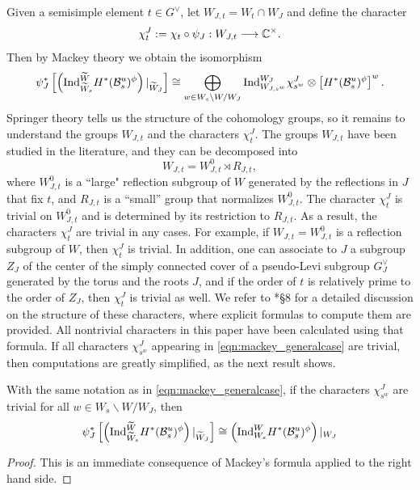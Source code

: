 Given a semisimple element $t\in G^\vee$, let $W_{J,t}=W_t\cap W_J$ and define the character
\begin{equation}
    \chi_t^J:=\chi_t\circ\psi_J:W_{J,t}\longrightarrow\mathbb{C}^\times.
\end{equation}
Then by Mackey theory we obtain the isomorphism
\begin{equation}\label{eqn:mackey_generalcase}
    \psi_J^*\left[\left(\mathrm{Ind}_{\widetilde{W}_s}^{\widetilde{W}}H^*(\mathcal{B}^u_s)^\phi\right)|_{\widetilde{W}_J}\right]\cong\bigoplus_{w\in W_s\backslash W/W_J}\mathrm{Ind}_{W_{J,s^w}}^{W_J}\chi_{s^w}^J\otimes\left[H^*(\mathcal{B}^u_s)^\phi\right]^w.
\end{equation}
Springer theory tells us the structure of the cohomology groups, so it remains to understand the groups $W_{J,t}$ and the characters $\chi_t^J$. The groups $W_{J,t}$ have been studied in the literature, and they can be decomposed into 
$$W_{J,t}=W_{J,t}^0\rtimes R_{J,t},$$
where $W_{J,t}^0$ is a ``large" reflection subgroup of $W$ generated by the reflections in $J$ that fix $t$, and $R_{J,t}$ is a ``small'' group that normalizes $W_{J,t}^0$. The character $\chi_t^J$ is trivial on $W_{J,t}^0$ and is determined by its restriction to $R_{J,t}$. As a result, the characters $\chi_t^J$ are trivial in any cases. For example, if $W_{J,t}=W_{J,t}^0$ is a reflection subgroup of $W$, then $\chi_t^J$ is trivial. In addition, one can associate to $J$ a subgroup $Z_J$ of the center of the simply connected cover of a pseudo-Levi subgroup $G^\vee_J$ generated by the torus and the roots $J$, and if the order of $t$ is relatively prime to the order of $Z_J$, then $\chi_t^J$ is trivial as well. We refer to \cite{Reeder2000}*{\S 8} for a detailed discussion on the structure of these characters, where explicit formulas to compute them are provided. All nontrivial characters in this paper have been calculated using that formula. If all characters $\chi_{s^w}^{J}$ appearing in \eqref{eqn:mackey_generalcase} are trivial, then computations are greatly simplified, as the next result shows.
\begin{lemma}\label{lem:mackey_restriction}
    With the same notation as in \eqref{eqn:mackey_generalcase}, if the characters $\chi_{s^w}^{J}$ are trivial for all $w\in W_s\backslash W/W_J$, then
    $$\psi_J^*\left[\left(\mathrm{Ind}_{\widetilde{W}_s}^{\widetilde{W}}H^*(\mathcal{B}^u_s)^\phi\right)|_{\widetilde{W}_J}\right]\cong\left(\mathrm{Ind}_{W_s}^W H^*(\mathcal{B}^u_s)^\phi\right)|_{W_J}$$
\end{lemma}
\begin{proof}
    This is an immediate consequence of Mackey's formula applied to the right hand side.
\end{proof}

